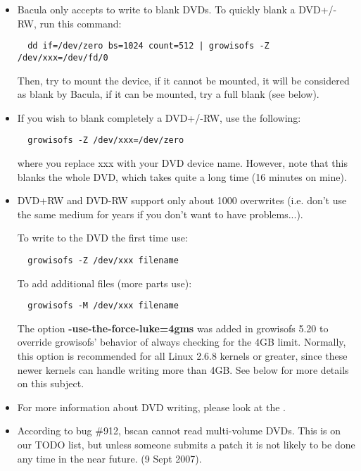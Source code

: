 \begin{itemize}
  {\bf Mounted Media} line should give you the information.

  To set the device to {\bf Restricted Overwrite} mode, run:
\begin{verbatim}
  dvd+rw-format /dev/xxx
\end{verbatim}
  If you want to set it back to the default {\bf Incremental Sequential} mode, run:
\begin{verbatim}
  dvd+rw-format -blank /dev/xxx
\end{verbatim}

\item Bacula only accepts to write to blank DVDs. To quickly blank a DVD+/-RW, run
  this command:
\begin{verbatim}
  dd if=/dev/zero bs=1024 count=512 | growisofs -Z /dev/xxx=/dev/fd/0
\end{verbatim}
  Then, try to mount the device, if it cannot be mounted, it will be considered
  as blank by Bacula, if it can be mounted, try a full blank (see below).

\item If you wish to blank completely a DVD+/-RW, use the following:
\begin{verbatim}
  growisofs -Z /dev/xxx=/dev/zero
\end{verbatim}
  where you replace xxx with your DVD device name. However, note that this
  blanks the whole DVD, which takes quite a long time (16 minutes on mine).
\item DVD+RW and DVD-RW support only about 1000 overwrites (i.e. don't use the
same medium for years if you don't want to have problems...).

To write to the DVD the first time use:
\begin{verbatim}
  growisofs -Z /dev/xxx filename
\end{verbatim}

To add additional files (more parts use):

\begin{verbatim}
  growisofs -M /dev/xxx filename
\end{verbatim}

The option {\bf -use-the-force-luke=4gms} was added in growisofs 5.20 to
override growisofs' behavior of always checking for the 4GB limit.
Normally, this option is recommended for all Linux 2.6.8 kernels or
greater, since these newer kernels can handle writing more than 4GB.
See below for more details on this subject.

\item For more information about DVD writing, please look at the
.

\item According to bug \#912, bscan cannot read multi-volume DVDs.  This is
on our TODO list, but unless someone submits a patch it is not likely to be
done any time in the near future. (9 Sept 2007).

\end{itemize}
